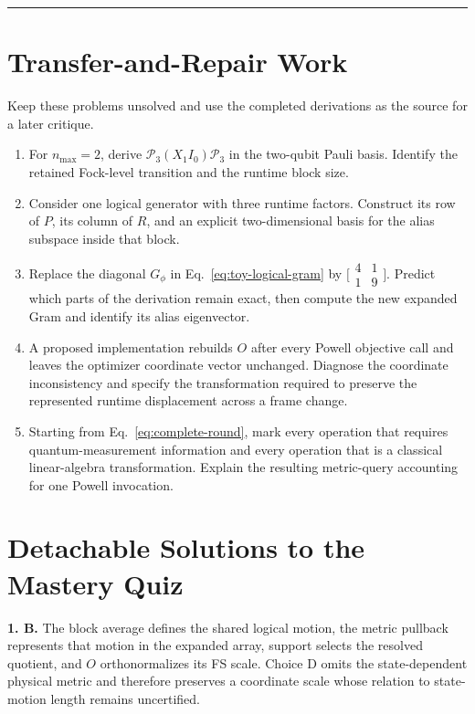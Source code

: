 \documentclass[10pt,twocolumn]{article}
\newcommand{\conceptbreak}{%
  \par\medskip\noindent
  {\color{black!30}\rule{\columnwidth}{0.35pt}}%
  \par\medskip}
\begin{document}
\conceptbreak

\section*{Transfer-and-Repair Work}

Keep these problems unsolved and use the completed derivations as the source
for a later critique.
\begin{enumerate}[leftmargin=1.25em,itemsep=4pt,topsep=2pt]
\item For \(n_{\max}=2\), derive
\(\mathcal P_3(X_1I_0)\mathcal P_3\) in the two-qubit Pauli basis. Identify
the retained Fock-level transition and the runtime block size.
\item Consider one logical generator with three runtime factors. Construct its
row of \(P\), its column of \(R\), and an explicit two-dimensional basis for
the alias subspace inside that block.
\item Replace the diagonal \(G_\phi\) in Eq.~\eqref{eq:toy-logical-gram} by
\(\bigl[\begin{smallmatrix}4&1\\1&9\end{smallmatrix}\bigr]\). Predict which
parts of the derivation remain exact, then compute the new expanded Gram and
identify its alias eigenvector.
\item A proposed implementation rebuilds \(O\) after every Powell objective
call and leaves the optimizer coordinate vector unchanged. Diagnose the
coordinate inconsistency and specify the transformation required to preserve
the represented runtime displacement across a frame change.
\item Starting from Eq.~\eqref{eq:complete-round}, mark every operation that
requires quantum-measurement information and every operation that is a
classical linear-algebra transformation. Explain the resulting metric-query
accounting for one Powell invocation.
\end{enumerate}

\newpage
\section*{Detachable Solutions to the Mastery Quiz}

\textbf{1. B.} The block average defines the shared logical motion, the metric
pullback represents that motion in the expanded array, support selects the
resolved quotient, and \(O\) orthonormalizes its FS scale. Choice D omits the
state-dependent physical metric and therefore preserves a coordinate scale
whose relation to state-motion length remains uncertified.
\end{document}
